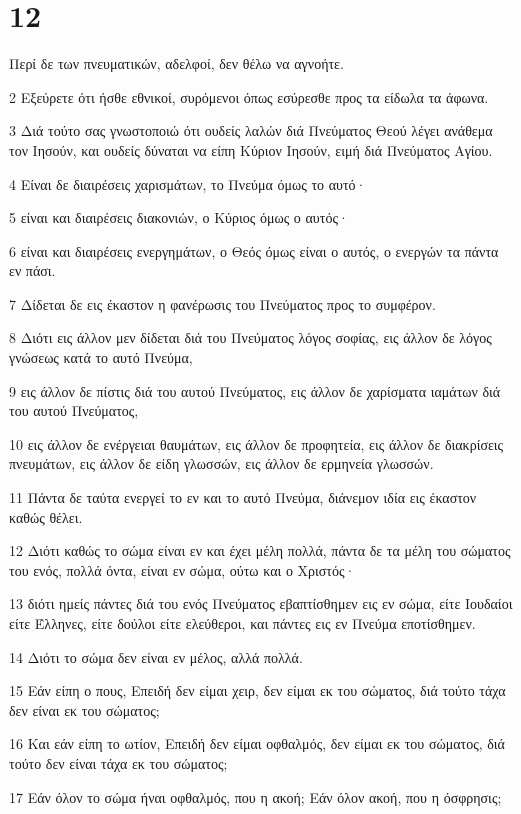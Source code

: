\chapter{12}

\par Περί δε των πνευματικών, αδελφοί, δεν θέλω να αγνοήτε.
\par 2 Εξεύρετε ότι ήσθε εθνικοί, συρόμενοι όπως εσύρεσθε προς τα είδωλα τα άφωνα.
\par 3 Διά τούτο σας γνωστοποιώ ότι ουδείς λαλών διά Πνεύματος Θεού λέγει ανάθεμα τον Ιησούν, και ουδείς δύναται να είπη Κύριον Ιησούν, ειμή διά Πνεύματος Αγίου.
\par 4 Είναι δε διαιρέσεις χαρισμάτων, το Πνεύμα όμως το αυτό·
\par 5 είναι και διαιρέσεις διακονιών, ο Κύριος όμως ο αυτός·
\par 6 είναι και διαιρέσεις ενεργημάτων, ο Θεός όμως είναι ο αυτός, ο ενεργών τα πάντα εν πάσι.
\par 7 Δίδεται δε εις έκαστον η φανέρωσις του Πνεύματος προς το συμφέρον.
\par 8 Διότι εις άλλον μεν δίδεται διά του Πνεύματος λόγος σοφίας, εις άλλον δε λόγος γνώσεως κατά το αυτό Πνεύμα,
\par 9 εις άλλον δε πίστις διά του αυτού Πνεύματος, εις άλλον δε χαρίσματα ιαμάτων διά του αυτού Πνεύματος,
\par 10 εις άλλον δε ενέργειαι θαυμάτων, εις άλλον δε προφητεία, εις άλλον δε διακρίσεις πνευμάτων, εις άλλον δε είδη γλωσσών, εις άλλον δε ερμηνεία γλωσσών.
\par 11 Πάντα δε ταύτα ενεργεί το εν και το αυτό Πνεύμα, διάνεμον ιδία εις έκαστον καθώς θέλει.
\par 12 Διότι καθώς το σώμα είναι εν και έχει μέλη πολλά, πάντα δε τα μέλη του σώματος του ενός, πολλά όντα, είναι εν σώμα, ούτω και ο Χριστός·
\par 13 διότι ημείς πάντες διά του ενός Πνεύματος εβαπτίσθημεν εις εν σώμα, είτε Ιουδαίοι είτε Έλληνες, είτε δούλοι είτε ελεύθεροι, και πάντες εις εν Πνεύμα εποτίσθημεν.
\par 14 Διότι το σώμα δεν είναι εν μέλος, αλλά πολλά.
\par 15 Εάν είπη ο πους, Επειδή δεν είμαι χειρ, δεν είμαι εκ του σώματος, διά τούτο τάχα δεν είναι εκ του σώματος;
\par 16 Και εάν είπη το ωτίον, Επειδή δεν είμαι οφθαλμός, δεν είμαι εκ του σώματος, διά τούτο δεν είναι τάχα εκ του σώματος;
\par 17 Εάν όλον το σώμα ήναι οφθαλμός, που η ακοή; Εάν όλον ακοή, που η όσφρησις;
